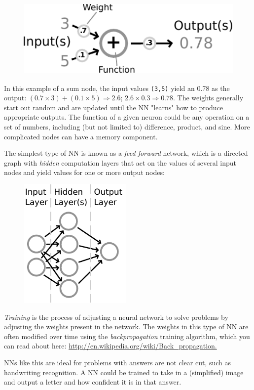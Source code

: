 \documentclass[12pt]{article}
\begin{document}
\begin{figure}[H]
\centerline{\includegraphics[height=1.5in]{figs/Neuron}}
\end{figure}



In this example of a sum node, the input values \verb|(3,5)| yield an 0.78 as the output: $(0.7\times 3)+(0.1\times 5) \Rightarrow 2.6$; $2.6 \times 0.3 \Rightarrow 0.78$. The weights generally start out random and are updated until the NN "learns" how to produce appropriate outputs. The function of a given neuron could be any operation on a set of numbers, including (but not limited to) difference, product, and sine. More complicated nodes can have a memory component.

The simplest type of NN is known as a \emph{feed forward} network, which is a directed graph with \emph{hidden} computation layers that act on the values of several input nodes and yield values for one or more output nodes:

\begin{figure}[H]
\centerline{\includegraphics[height=2.5in]{figs/NN}}
\end{figure}
\emph{Training} is the process of adjusting a neural network to solve problems by adjusting the weights present in the network. The weights in this type of NN are often modified over time using the \emph{backpropagation} training algorithm, which you can read about here: \url{http://en.wikipedia.org/wiki/Back_propagation.}

NNs like this are ideal for problems with answers are not clear cut, such as handwriting recognition. A NN could be trained to take in a (simplified) image and output a letter and how confident it is in that answer.
\end{document}
